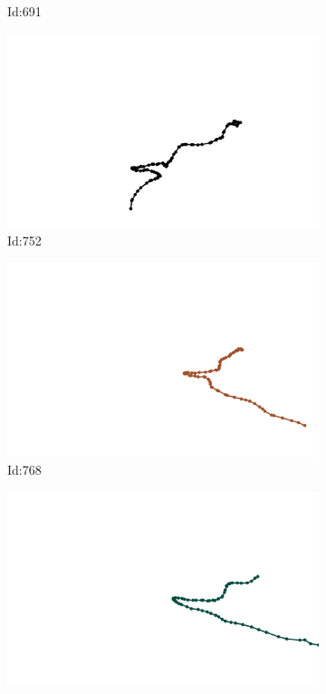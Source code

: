\documentclass[12pt,twoside]{report}
\begin{document}
\begin{figure}
\begin{subfigure}[b]{0.20\textwidth}
\caption{Id:691}
\end{subfigure}
\begin{subfigure}[b]{0.20\textwidth}
\centering
\includegraphics[width=\textwidth]{../trajectories/752.png}
\caption{Id:752}
\end{subfigure}
\begin{subfigure}[b]{0.20\textwidth}
\centering
\includegraphics[width=\textwidth]{../trajectories/768.png}
\caption{Id:768}
\end{subfigure}
\begin{subfigure}[b]{0.20\textwidth}
\centering
\includegraphics[width=\textwidth]{../trajectories/818.png}

\end{subfigure}
\end{figure}
\end{document}
